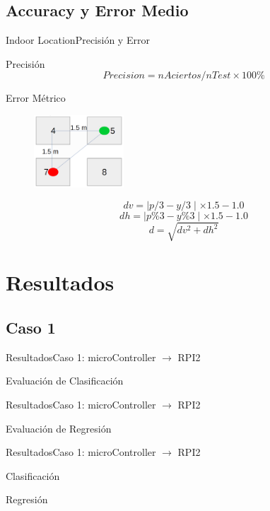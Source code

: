 \documentclass[10pt]{beamer}
\begin{document}
\subsection{Accuracy y Error Medio}
\begin{frame}{Indoor Location}{Precisión y Error}
\begin{block}{Precisión}
$$Precision = nAciertos/nTest\times 100\%$$
\end{block}
\begin{block}{Error Métrico}
\begin{figure}
    \centering
    \includegraphics[width=0.3\textwidth]{AAUgraphics/espacio}
\end{figure}
$$dv = \mid p/3 - y/3\mid\times 1.5-1.0$$
$$dh= \mid p\%3 - y\%3\mid\times 1.5-1.0$$
$$d = \sqrt{dv^2 + dh^2}$$
\end{block}
\end{frame}
\section{Resultados}
\subsection{Caso 1}
\begin{frame}{Resultados}{Caso 1: microController $\rightarrow$ RPI2}
\begin{block}{Evaluación de Clasificación}

\end{block}
\end{frame}
\begin{frame}{Resultados}{Caso 1: microController $\rightarrow$ RPI2}
\begin{block}{Evaluación de Regresión}

\end{block}
\end{frame}
\begin{frame}{Resultados}{Caso 1: microController $\rightarrow$ RPI2}
\begin{multicols}{2}
\begin{block}{Clasificación}

\end{block}

\begin{block}{Regresión}

\end{block}
\end{multicols}
\end{frame}
\end{document}
